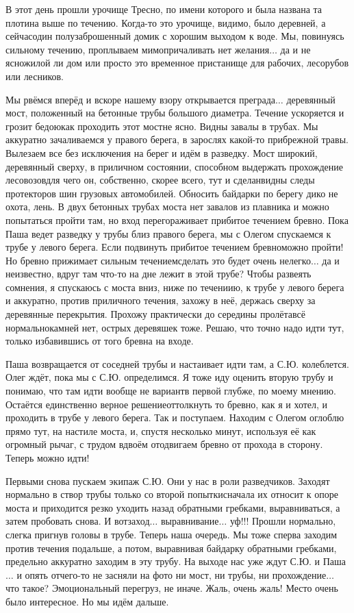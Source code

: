 В этот день прошли урочище Тресно, по имени которого и была названа та плотина выше по течению. Когда-то это урочище, видимо, было деревней, а сейчас\mdash один полузаброшенный домик с хорошим выходом к воде. Мы, повинуясь сильному течению, проплываем мимо\mdash причаливать нет желания$\ldots$ да и не ясно\mdash жилой ли дом или просто это временное пристанище для рабочих, лесорубов или лесников.

Мы рвёмся вперёд и вскоре нашему взору открывается преграда$\ldots$ деревянный мост, положенный на бетонные трубы большого диаметра. Течение ускоряется и грозит бедою\mdash как проходить этот мост\mdash не ясно. Видны завалы в трубах. Мы аккуратно зачаливаемся у правого берега, в зарослях какой-то прибрежной травы. Вылезаем все без исключения на берег и идём в разведку. Мост широкий, деревянный сверху, в приличном состоянии, способном выдержать прохождение лесовозов\mdash для чего он, собственно, скорее всего, тут и сделан\mdash видны следы протекторов шин грузовых автомобилей. Обносить байдарки по берегу дико не охота, лень. В двух бетонных трубах моста нет завалов из плавника и можно попытаться пройти там, но вход перегораживает прибитое течением бревно. Пока Паша ведет разведку у трубы близ правого берега, мы с Олегом спускаемся к трубе у левого берега. Если подвинуть прибитое течением бревно\mdash можно пройти! Но бревно прижимает сильным течением\mdash сделать это будет очень нелегко$\ldots$ да и неизвестно, вдруг там что-то на дне лежит в этой трубе? Чтобы развеять сомнения, я спускаюсь с моста вниз, ниже по течениию, к трубе у левого берега и аккуратно, против приличного течения, захожу в неё, держась сверху за деревянные перекрытия. Прохожу практически до середины пролёта\mdash всё нормально\mdash камней нет, острых деревяшек тоже. Решаю, что точно надо идти тут, только избавившись от того бревна на входе.

Паша возвращается от соседней трубы и настаивает идти там, а С.Ю. колеблется. Олег ждёт, пока мы с С.Ю. определимся. Я тоже иду оценить вторую трубу и понимаю, что там идти вообще не вариант\mdash в первой глубже, по моему мнению. Остаётся единственно верное решение\mdash оттолкнуть то бревно, как я и хотел, и проходить в трубе у левого берега. Так и поступаем. Находим с Олегом оглоблю прямо тут, на настиле моста, и, спустя несколько минут, используя её как огромный рычаг, с трудом вдвоём отодвигаем бревно от прохода в сторону. Теперь можно идти! 

Первыми снова пускаем экипаж С.Ю. Они у нас в роли разведчиков. Заходят нормально в створ трубы только со второй попытки\mdash сначала их относит к опоре моста и приходится резко уходить назад обратными гребками, выравниваться, а затем пробовать снова. И вот\mdash заход$\ldots$ выравнивание$\ldots$ уф!!! Прошли нормально, слегка пригнув головы в трубе. Теперь наша очередь. Мы тоже сперва заходим против течения подальше, а потом, выравнивая байдарку обратными гребками, предельно аккуратно заходим в эту трубу. На выходе нас уже ждут С.Ю. и Паша$\ldots$ и опять отчего-то не засняли на фото ни мост, ни трубы, ни прохождение$\ldots$ что такое? Эмоциональный перегруз, не иначе. Жаль, очень жаль! Место очень было интересное. Но мы идём дальше.

